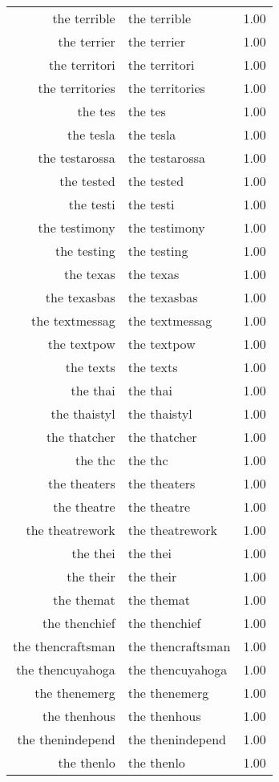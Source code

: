 \begin{table}[ht]
\begin{tabular}{rlr}
  the terrible & the terrible & 1.00 \\ 
  the terrier & the terrier & 1.00 \\ 
  the territori & the territori & 1.00 \\ 
  the territories & the territories & 1.00 \\ 
  the tes & the tes & 1.00 \\ 
  the tesla & the tesla & 1.00 \\ 
  the testarossa & the testarossa & 1.00 \\ 
  the tested & the tested & 1.00 \\ 
  the testi & the testi & 1.00 \\ 
  the testimony & the testimony & 1.00 \\ 
  the testing & the testing & 1.00 \\ 
  the texas & the texas & 1.00 \\ 
  the texasbas & the texasbas & 1.00 \\ 
  the textmessag & the textmessag & 1.00 \\ 
  the textpow & the textpow & 1.00 \\ 
  the texts & the texts & 1.00 \\ 
  the thai & the thai & 1.00 \\ 
  the thaistyl & the thaistyl & 1.00 \\ 
  the thatcher & the thatcher & 1.00 \\ 
  the thc & the thc & 1.00 \\ 
  the theaters & the theaters & 1.00 \\ 
  the theatre & the theatre & 1.00 \\ 
  the theatrework & the theatrework & 1.00 \\ 
  the thei & the thei & 1.00 \\ 
  the their & the their & 1.00 \\ 
  the themat & the themat & 1.00 \\ 
  the thenchief & the thenchief & 1.00 \\ 
  the thencraftsman & the thencraftsman & 1.00 \\ 
  the thencuyahoga & the thencuyahoga & 1.00 \\ 
  the thenemerg & the thenemerg & 1.00 \\ 
  the thenhous & the thenhous & 1.00 \\ 
  the thenindepend & the thenindepend & 1.00 \\ 
  the thenlo & the thenlo & 1.00 \\ 

\end{tabular}
\end{table}
